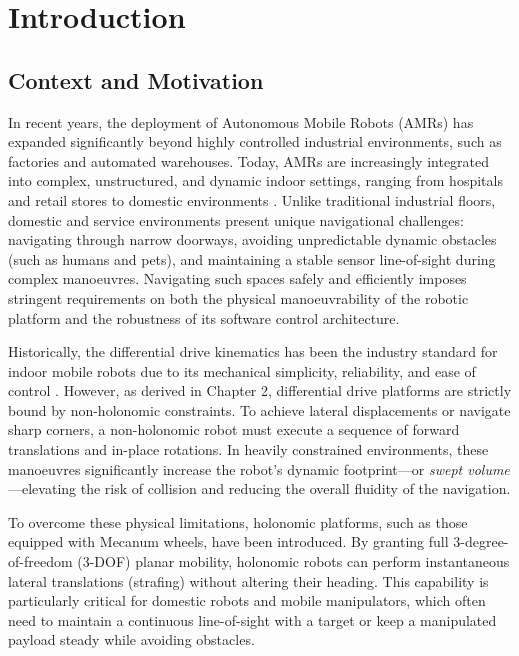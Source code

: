 
\chapter{Introduction}
\label{ch:intro}

\section{Context and Motivation}

In recent years, the deployment of Autonomous Mobile Robots (AMRs) has expanded significantly beyond highly controlled industrial environments, such as factories and automated warehouses. Today, AMRs are increasingly integrated into complex, unstructured, and dynamic indoor settings, ranging from hospitals and retail stores to domestic environments \cite{siegwart2004introduction}. Unlike traditional industrial floors, domestic and service environments present unique navigational challenges: navigating through narrow doorways, avoiding unpredictable dynamic obstacles (such as humans and pets), and maintaining a stable sensor line-of-sight during complex manoeuvres. Navigating such spaces safely and efficiently imposes stringent requirements on both the physical manoeuvrability of the robotic platform and the robustness of its software control architecture.

Historically, the differential drive kinematics has been the industry standard for indoor mobile robots due to its mechanical simplicity, reliability, and ease of control \cite{siegwart2004introduction}. However, as derived in Chapter 2, differential drive platforms are strictly bound by non-holonomic constraints. To achieve lateral displacements or navigate sharp corners, a non-holonomic robot must execute a sequence of forward translations and in-place rotations. In heavily constrained environments, these manoeuvres significantly increase the robot's dynamic footprint—or \textit{swept volume}—elevating the risk of collision and reducing the overall fluidity of the navigation. 

To overcome these physical limitations, holonomic platforms, such as those equipped with Mecanum wheels, have been introduced. By granting full 3-degree-of-freedom (3-DOF) planar mobility, holonomic robots can perform instantaneous lateral translations (strafing) without altering their heading. This capability is particularly critical for domestic robots and mobile manipulators, which often need to maintain a continuous line-of-sight with a target or keep a manipulated payload steady while avoiding obstacles.

